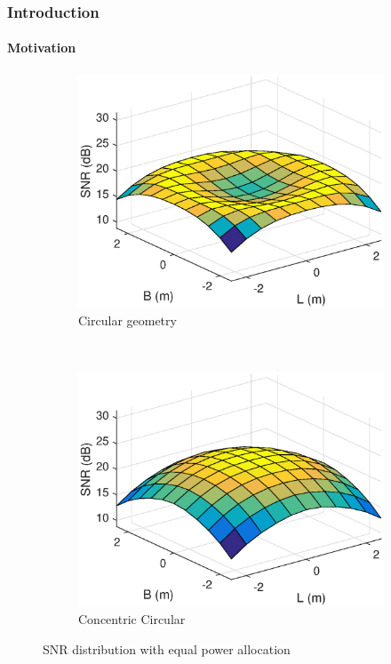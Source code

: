 \documentclass[slidestop,usepdftitle=false]{gvvslides}
\begin{document}
\begin{frame}
\frametitle{Introduction}
\framesubtitle{Motivation}

\begin{figure}[h!]
    \centering

    \begin{subfigure}[t]{.5\columnwidth}
        \centering
         \includegraphics[width=\columnwidth]{circleNoPowerDist_new}
        \caption{Circular geometry}
\label{fig2:subfig1}        
    \end{subfigure}%
    ~ 
    \begin{subfigure}[t]{.5\columnwidth}
        \centering
        \includegraphics[width=\columnwidth]{concircleNoPowerDist_new}
        \caption{Concentric Circular }
\label{fig2:subfig2}
    \end{subfigure}
    \caption{SNR distribution with equal power allocation}
    \label{fig:SNRDistCircles}
    \end{figure}
\end{frame}
\end{document}
